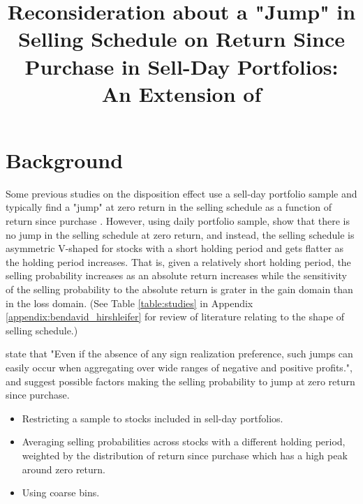 \documentclass[11pt, a4paper]{article}
\title{Reconsideration about a "Jump" in Selling Schedule on Return Since Purchase in Sell-Day Portfolios:\\ An Extension of \citet{BenDavidHirshleifer12}}
\author{}
\newcommand{\HS}[1]{\textcolor{blue}{HS: #1}}
\begin{document}
\maketitle


\section{Background}
Some previous studies on the disposition effect use a sell-day portfolio sample and typically find a "jump" at zero return in the selling schedule as a function of return since purchase \citep[e.g.,][]{Kaustia10}.
However, using daily portfolio sample, \citet{BenDavidHirshleifer12} show that there is no jump in the selling schedule at zero return, and instead, the selling schedule is asymmetric V-shaped for stocks with a short holding period and gets flatter as the holding period increases. That is, given a relatively short holding period, the selling probability increases as an absolute return increases while the sensitivity of the selling probability to the absolute return is grater in the gain domain than in the loss domain. (See Table \ref{table:studies} in Appendix \ref{appendix:bendavid_hirshleifer} for review of literature relating to the shape of selling schedule.)

\citet[p2520]{BenDavidHirshleifer12} state that "Even if the absence of any sign realization preference, such jumps can easily occur when aggregating over wide ranges of negative and positive profits.", and suggest possible factors making the selling probability to jump at zero return since purchase.
\begin{itemize}[noitemsep,nolistsep]
	\item Restricting a sample to stocks included in sell-day portfolios.
	\item Averaging selling probabilities across stocks with a different holding period, weighted by the distribution of return since purchase which has a high peak around zero return.
	\item Using coarse bins.\\
\end{itemize}
\end{document}
